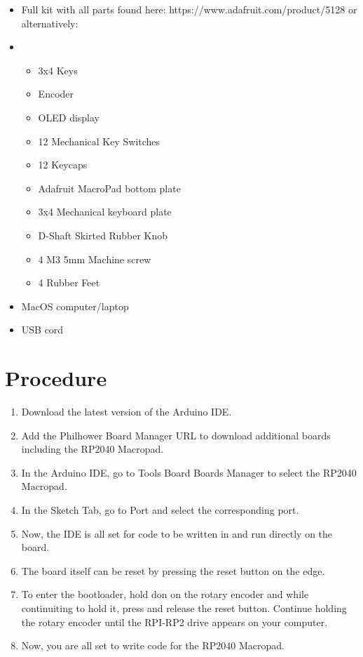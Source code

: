 \documentclass{article}
\begin{document}
\begin{itemize}
    \item Full kit with all parts found here: https://www.adafruit.com/product/5128 or alternatively:
    \item
        \begin{itemize}
            \item 3x4 Keys
            \item Encoder
            \item OLED display
            \item 12 Mechanical Key Switches
            \item 12 Keycaps
            \item Adafruit MacroPad bottom plate
            \item 3x4 Mechanical keyboard plate
            \item D-Shaft Skirted Rubber Knob
            \item 4 M3 5mm Machine screw
            \item 4 Rubber Feet
        \end{itemize}
    \item MacOS computer/laptop
    \item USB cord
\end{itemize}

\section{Procedure}

\begin{enumerate}
    \item Download the latest version of the Arduino IDE.
    \item Add the Philhower Board Manager URL to download additional boards including the RP2040 Macropad.
    \item In the Arduino IDE, go to Tools \> Board \> Boards Manager to select the RP2040 Macropad. 
    \item In the Sketch Tab, go to Port and select the corresponding port. 
    \item Now, the IDE is all set for code to be written in and run directly on the board. 
    \item The board itself can  be reset by pressing the reset button on the edge.
    \item To enter the bootloader, hold don on the rotary encoder and while continuiting to hold it, press and release the reset button. Continue holding the rotary encoder until the RPI-RP2 drive appears on your computer. 
    \item Now, you are all set to write code for the RP2040 Macropad. 
\end{enumerate}
\end{document}
